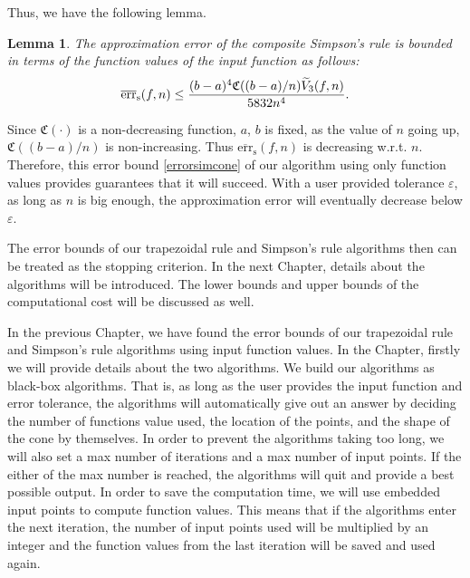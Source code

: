 \documentclass[draft]{iitthesis}
\DeclareMathOperator{\Var}{Var}
\newtheorem{lem}{Lemma}
\theoremstyle{definition}
\theoremstyle{remark}
\begin{document}
Thus, we have the following lemma.
\begin{lem}\label{lemmaerrorboundsim}
    The approximation error of the composite Simpson's rule is bounded in terms of the function values of the input function as follows:
    \begin{equation}\label{errorsimcone}
      \overline{\textup{err}}_{\text{s}}(f,n)\leq \frac{(b-a)^4\mathfrak{C}((b-a)/n)\widetilde{V}_3(f,n)}{5832n^4}.
    \end{equation}
\end{lem}


Since $\mathfrak{C}(\cdot)$ is a non-decreasing function, $a$, $b$ is fixed, as the value of $n$ going up, $\mathfrak{C}((b-a)/n)$ is non-increasing. Thus $\overline{\text{err}}_{\text{s}}(f,n)$ is decreasing w.r.t. $n$. Therefore, this error bound \eqref{errorsimcone} of our algorithm using only function values provides guarantees that it will succeed. With a user provided tolerance $\varepsilon$, as long as $n$ is big enough, the approximation error will eventually decrease below $\varepsilon$.

The error bounds of our trapezoidal rule and Simpson's rule algorithms then can be treated as the stopping criterion. In the next Chapter, details about the algorithms will be introduced. The lower bounds and upper bounds of the computational cost will be discussed as well.

%






In the previous Chapter, we have found the error bounds of our trapezoidal rule and Simpson's rule algorithms using input function values. In the Chapter, firstly we will provide details about the two algorithms. We build our algorithms as black-box algorithms. That is, as long as the user provides the input function and error tolerance, the algorithms will automatically give out an answer by deciding the number of functions value used, the location of the points, and the shape of the cone by themselves. In order to prevent the algorithms taking too long, we will also set a max number of iterations and a max number of input points. If the either of the max number is reached, the algorithms will quit and provide a best possible output. In order to save the computation time, we will use embedded input points to compute function values. This means that if the algorithms enter the next iteration, the number of input points used will be multiplied by an integer and the function values from the last iteration will be saved and used again.
\end{document}
